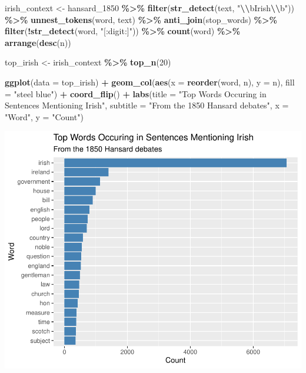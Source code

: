 \documentclass[
]{article}
\newenvironment{Shaded}{\begin{snugshade}}{\end{snugshade}}
\newcommand{\AttributeTok}[1]{\textcolor[rgb]{0.13,0.29,0.53}{#1}}
\newcommand{\DecValTok}[1]{\textcolor[rgb]{0.00,0.00,0.81}{#1}}
\newcommand{\FunctionTok}[1]{\textcolor[rgb]{0.13,0.29,0.53}{\textbf{#1}}}
\newcommand{\NormalTok}[1]{#1}
\newcommand{\OtherTok}[1]{\textcolor[rgb]{0.56,0.35,0.01}{#1}}
\newcommand{\SpecialCharTok}[1]{\textcolor[rgb]{0.81,0.36,0.00}{\textbf{#1}}}
\newcommand{\StringTok}[1]{\textcolor[rgb]{0.31,0.60,0.02}{#1}}
\begin{document}
\begin{Shaded}
\begin{Highlighting}[]
\NormalTok{irish\_context }\OtherTok{\textless{}{-}}\NormalTok{ hansard\_1850 }\SpecialCharTok{\%\textgreater{}\%} 
  \FunctionTok{filter}\NormalTok{(}\FunctionTok{str\_detect}\NormalTok{(text, }\StringTok{"}\SpecialCharTok{\textbackslash{}\textbackslash{}}\StringTok{bIrish}\SpecialCharTok{\textbackslash{}\textbackslash{}}\StringTok{b"}\NormalTok{)) }\SpecialCharTok{\%\textgreater{}\%}
  \FunctionTok{unnest\_tokens}\NormalTok{(word, text) }\SpecialCharTok{\%\textgreater{}\%}
  \FunctionTok{anti\_join}\NormalTok{(stop\_words) }\SpecialCharTok{\%\textgreater{}\%}
  \FunctionTok{filter}\NormalTok{(}\SpecialCharTok{!}\FunctionTok{str\_detect}\NormalTok{(word, }\StringTok{"[:digit:]"}\NormalTok{)) }\SpecialCharTok{\%\textgreater{}\%}
  \FunctionTok{count}\NormalTok{(word) }\SpecialCharTok{\%\textgreater{}\%}
  \FunctionTok{arrange}\NormalTok{(}\FunctionTok{desc}\NormalTok{(n))}
\end{Highlighting}
\end{Shaded}

\begin{Shaded}
\begin{Highlighting}[]
\NormalTok{top\_irish }\OtherTok{\textless{}{-}}\NormalTok{ irish\_context  }\SpecialCharTok{\%\textgreater{}\%}
  \FunctionTok{top\_n}\NormalTok{(}\DecValTok{20}\NormalTok{)}

\FunctionTok{ggplot}\NormalTok{(}\AttributeTok{data =}\NormalTok{ top\_irish) }\SpecialCharTok{+}
  \FunctionTok{geom\_col}\NormalTok{(}\FunctionTok{aes}\NormalTok{(}\AttributeTok{x =} \FunctionTok{reorder}\NormalTok{(word, n), }
               \AttributeTok{y =}\NormalTok{ n),}
           \AttributeTok{fill =} \StringTok{"steel blue"}\NormalTok{) }\SpecialCharTok{+}
  \FunctionTok{coord\_flip}\NormalTok{() }\SpecialCharTok{+}
  \FunctionTok{labs}\NormalTok{(}\AttributeTok{title =} \StringTok{"Top Words Occuring in Sentences Mentioning Irish"}\NormalTok{,}
       \AttributeTok{subtitle =} \StringTok{"From the 1850 Hansard debates"}\NormalTok{,}
       \AttributeTok{x =} \StringTok{"Word"}\NormalTok{,}
       \AttributeTok{y =} \StringTok{"Count"}\NormalTok{) }
\end{Highlighting}
\end{Shaded}

\includegraphics[width=0.8\linewidth]{ch1-11.25.2024_files/figure-latex/unnamed-chunk-54-1}
\end{document}
